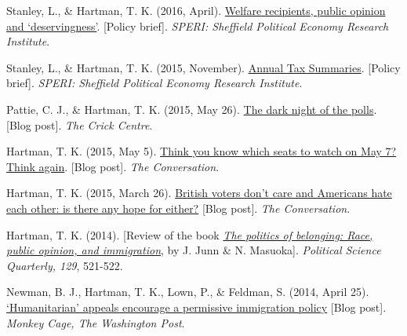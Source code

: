 \documentclass[12pt]{article}
\begin{document}
\begin{bibenum}
    \item Stanley, L., \& Hartman, T. K. (2016, April). 
    \href{http://speri.dept.shef.ac.uk/wp-content/uploads/2016/04/Brief-22-Welfare-recipients-public-opinion-and-deservingness.pdf}
    {Welfare recipients, public opinion and `deservingness'}. [Policy brief]. 
    \textit{SPERI: Sheffield Political Economy Research Institute}.  

    \item Stanley, L., \& Hartman, T. K. (2015, November). 
    \href{http://speri.dept.shef.ac.uk/wp-content/uploads/2015/11/Brief16-The-UK-annual-tax-summaries.pdf}
    {Annual Tax Summaries}. [Policy brief]. 
    \textit{SPERI: Sheffield Political Economy Research Institute}.  
        
    \item Pattie, C. J., \& Hartman, T. K. (2015, May 26). 
    \href{http://www.crickcentre.org/blog/the-dark-night-of-the-polls/}
    {The dark night of the polls}. [Blog post]. 
    \textit{The Crick Centre}.   
   
    \item Hartman, T. K. (2015, May 5). 
    \href{https://theconversation.com/think-you-know-which-seats-to-watch-on-may-7-think-again-41073}
    {Think you know which seats to watch on May 7? Think again}. [Blog post]. 
    \textit{The Conversation}.

    \item Hartman, T. K. (2015, March 26). 
    \href{https://theconversation.com/british-voters-dont-care-and-americans-hate-each-other-is-there-any-hope-for-either-39279}
    {British voters don't care and Americans hate each other: is there any hope for either?} [Blog post]. 
    \textit{The Conversation}.

	\item Hartman, T. K. (2014). [Review of the book 
    \href{http://onlinelibrary.wiley.com/doi/10.1002/polq.12227/abstract}	
	{\emph{The politics of belonging: Race, public opinion, and immigration}}, 
		by J. Junn \& N. Masuoka]. \emph{Political 
		Science Quarterly, 129}, 521-522.
		
	\item Newman, B. J., {Hartman, T. K.}, Lown, P., \& Feldman, S. (2014, April 25). 
	\href{http://www.washingtonpost.com/blogs/monkey-cage/wp/2014/04/25/humanitarian-appeals-encourage-a-permissive-immigration-policy/}
		{`Humanitarian' appeals encourage a permissive immigration policy} [Blog post]. 
		\textit{Monkey Cage, The Washington Post}.
		

\end{bibenum}
\end{document}

